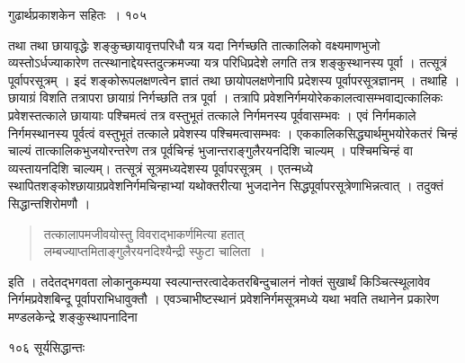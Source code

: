 \documentclass[11pt, openany]{book}
\begin{document}
\newpage


\hspace{3cm} गुढार्थप्रकाशकेन सहितः~। \hfill १०५
\vspace{1cm}

\begin{sloppypar}
\noindent तथा तथा छायावृद्धेः शङ्कुच्छायावृत्तपरिधौ यत्र यदा निर्गच्छति तात्कालिको वक्ष्यमाणभुजो व्यस्तोऽर्धज्याकारेण तत्स्थानाद्देयस्तदुत्क्रमज्या यत्र परिधिप्रदेशे लगति तत्र शङ्कुस्थानस्य पूर्वा । तत्सूत्रं पूर्वापरसूत्रम् । इदं शङ्कोरूपलक्षणत्वेन ज्ञातं तथा छायोपलक्षणेनापि प्रदेशस्य पूर्वापरसूत्रज्ञानम् । तथाहि । छायाग्रं विशति तत्रापरा छायाग्रं निर्गच्छति तत्र पूर्वा । तत्रापि प्रवेशनिर्गमयोरेककालत्वासम्भवाद्यत्कालिकः प्रवेशस्तत्काले छायायाः पश्चिमत्वं तत्र वस्तुभूतं तत्काले निर्गमनस्य पूर्ववासम्भवः । एवं निर्गमकाले निर्गमस्थानस्य पूर्वत्वं वस्तुभूतं तत्काले प्रवेशस्य पश्चिमत्वासम्भवः । एककालिकसिद्ध्यार्थमुभयोरेकतरं चिन्हं चाल्यं तात्कालिकभुजयोरन्तरेण तत्र पूर्वचिन्हं भुजान्तराङ्गुलैरयनदिशि चाल्यम् । पश्चिमचिन्हं वा व्यस्तायनदिशि चाल्यम्। तत्सूत्रं सूत्रमध्यदेशस्य पूर्वापरसूत्रम् । एतन्मध्ये स्थापितशङ्कोश्छायाग्रप्रवेशनिर्गमचिन्हाभ्यां यथोक्तरीत्या भुजदानेन सिद्धपूर्वापरसूत्रेणाभिन्नत्वात् । तदुक्तं सिद्धान्तशिरोमणौ ।
\end{sloppypar}
\begin{quote}

 {\qt तत्कालापमजीवयोस्तु विवराद्भाकर्णमित्या हतात्\\
लम्बज्याप्तमिताङ्गुलैरयनदिश्यैन्द्री स्फुटा चालिता~।}
\end{quote}
\begin{sloppypar}
 इति । तदेतद्भगवता लोकानुकम्पया स्वल्पान्तरत्वादेकतरबिन्दुचालनं नोक्तं सुखार्थं किञ्चित्स्थूलावेव निर्गमप्रवेशबिन्दू पूर्वापराभिधावुक्तौ । एवञ्चाभीष्टस्थानं प्रवेशनिर्गमसूत्रमध्ये यथा भवति तथानेन प्रकारेण मण्डलकेन्द्रे शङ्कुस्थापनादिना\textendash
\end{sloppypar}


\newpage


\noindent १०६ \hspace{4cm} सूर्यसिद्धान्तः
\vspace{1cm}
\end{document}
